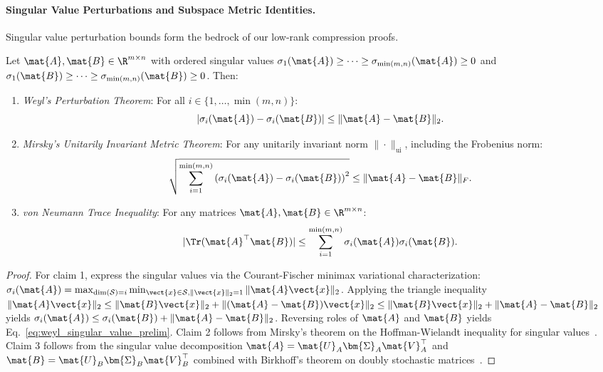 \paragraph{Singular Value Perturbations and Subspace Metric Identities.}
Singular value perturbation bounds form the bedrock of our low-rank compression proofs.
\begin{lemma}
\label{lem:weyl_mirsky_preliminaries}
Let $\mat{A}, \mat{B} \in \R^{m \times n}$ with ordered singular values $\sigma_1(\mat{A}) \ge \dots \ge \sigma_{\min(m, n)}(\mat{A}) \ge 0$ and $\sigma_1(\mat{B}) \ge \dots \ge \sigma_{\min(m, n)}(\mat{B}) \ge 0$. Then:
\begin{enumerate}
    \item \emph{Weyl's Perturbation Theorem}: For all $i \in \{1, \dots, \min(m, n)\}$:
    \begin{equation}
    |\sigma_i(\mat{A}) - \sigma_i(\mat{B})| \le \|\mat{A} - \mat{B}\|_2.
    \label{eq:weyl_singular_value_prelim}
    \end{equation}
    \item \emph{Mirsky's Unitarily Invariant Metric Theorem}: For any unitarily invariant norm $\|\cdot\|_{\text{ui}}$, including the Frobenius norm:
    \begin{equation}
    \sqrt{\sum_{i=1}^{\min(m, n)} \left( \sigma_i(\mat{A}) - \sigma_i(\mat{B}) \right)^2} \le \|\mat{A} - \mat{B}\|_F.
    \label{eq:mirsky_frobenius_prelim}
    \end{equation}
    \item \emph{von Neumann Trace Inequality}: For any matrices $\mat{A}, \mat{B} \in \R^{m \times n}$:
    \begin{equation}
    |\Tr(\mat{A}^\top \mat{B})| \le \sum_{i=1}^{\min(m, n)} \sigma_i(\mat{A}) \sigma_i(\mat{B}).
    \label{eq:von_neumann_trace_prelim}
    \end{equation}
\end{enumerate}
\end{lemma}

\begin{proof}
For claim 1, express the singular values via the Courant-Fischer minimax variational characterization:
$\sigma_i(\mat{A}) = \max_{\dim(\mathcal{S})=i} \min_{\vect{x} \in \mathcal{S}, \|\vect{x}\|_2=1} \|\mat{A} \vect{x}\|_2$.
Applying the triangle inequality $\|\mat{A}\vect{x}\|_2 \le \|\mat{B}\vect{x}\|_2 + \|(\mat{A} - \mat{B})\vect{x}\|_2 \le \|\mat{B}\vect{x}\|_2 + \|\mat{A} - \mat{B}\|_2$ yields $\sigma_i(\mat{A}) \le \sigma_i(\mat{B}) + \|\mat{A} - \mat{B}\|_2$. Reversing roles of $\mat{A}$ and $\mat{B}$ yields Eq.~\eqref{eq:weyl_singular_value_prelim}.
Claim 2 follows from Mirsky's theorem on the Hoffman-Wielandt inequality for singular values~\cite{golub2013matrix}.
Claim 3 follows from the singular value decomposition $\mat{A} = \mat{U}_A \bm{\Sigma}_A \mat{V}_A^\top$ and $\mat{B} = \mat{U}_B \bm{\Sigma}_B \mat{V}_B^\top$ combined with Birkhoff's theorem on doubly stochastic matrices~\cite{golub2013matrix}.
\end{proof}

